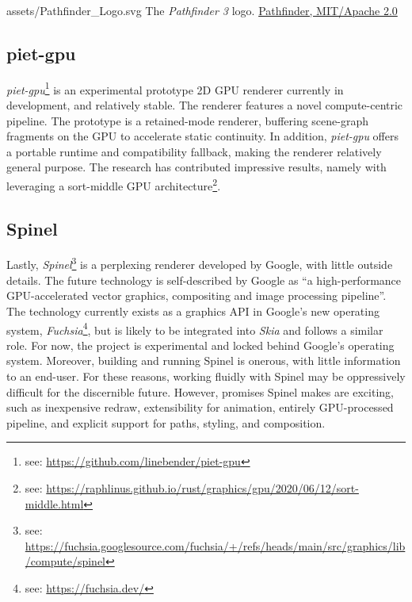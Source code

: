 \smallsvg
{assets/Pathfinder_Logo.svg}
{The \textit{Pathfinder 3} logo.\label{fig:pathfinder_logo}}
{\href{https://github.com/servo/pathfinder}{Pathfinder, MIT/Apache 2.0}}
\medskip

\subsection{piet-gpu}\label{sec:piet-gpu}
\textit{piet-gpu}\footnote{see: \href{https://github.com/linebender/piet-gpu}{https://github.com/linebender/piet-gpu}} is an experimental prototype 2D GPU renderer currently in development, and relatively stable. The renderer features a novel compute-centric pipeline. The prototype is a retained-mode renderer, buffering scene-graph fragments on the GPU to accelerate static continuity. In addition, \textit{piet-gpu} offers a portable runtime and compatibility fallback, making the renderer relatively general purpose. The research has contributed impressive results, namely with leveraging a sort-middle GPU architecture\footnote{see: \href{https://raphlinus.github.io/rust/graphics/gpu/2020/06/12/sort-middle.html}{https://raphlinus.github.io/rust/graphics/gpu/2020/06/12/sort-middle.html}}.

\subsection{Spinel}\label{sec:spinel}
Lastly, \textit{Spinel}\footnote{see: \href{https://fuchsia.googlesource.com/fuchsia/+/refs/heads/main/src/graphics/lib/compute/spinel}{https://fuchsia.googlesource.com/fuchsia/+/refs/heads/main/src/graphics/lib/compute/spinel}} is a perplexing renderer developed by Google, with little outside details. The future technology is self-described by Google as ``a high-performance GPU-accelerated vector graphics, compositing and image processing pipeline''\cite{Spinel}. The technology currently exists as a graphics API in Google's new operating system, \textit{Fuchsia}\footnote{see: \href{https://fuchsia.dev/}{https://fuchsia.dev/}}, but is likely to be integrated into \textit{Skia} and follows a similar role. For now, the project is experimental and locked behind Google's operating system. Moreover, building and running Spinel is onerous, with little information to an end-user. For these reasons, working fluidly with Spinel may be oppressively difficult for the discernible future. However, promises Spinel makes are exciting, such as inexpensive redraw, extensibility for animation, entirely GPU-processed pipeline, and explicit support for paths, styling, and composition\cite{Spinel_Features}.

